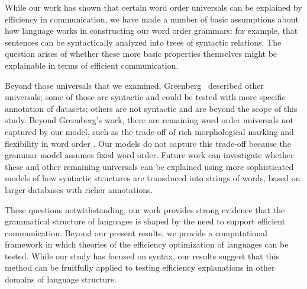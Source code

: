 \documentclass[9pt,twocolumn,twoside,lineno]{pnas-new}
\begin{document}
While our work has shown that certain word order universals can be explained by efficiency in communication, we have made a number of basic assumptions about how language works in constructing our word order grammars: for example, that sentences can be syntactically analyzed into trees of syntactic relations. The question arises of whether these more basic properties themselves might be explainable in terms of efficient communication.


Beyond those universals that we examined, Greenberg~\cite{greenberg1963universals} described other universals; some of those are syntactic and could be tested with more specific annotation of datasets; others are not syntactic and are beyond the scope of this study.
Beyond Greenberg's work, there are remaining word order universals not captured by our model, such as the trade-off of rich morphological marking and flexibility in word order \cite{jespersen1922,mcfadden2003morphological,futrell2015quantifying}.
Our models do not capture this trade-off because the grammar model assumes fixed word order.
Future work can investigate whether these and other remaining universals can be explained using more sophisticated models of how syntactic structures are transduced into strings of words, based on larger databases with richer annotations.


These questions notwithstanding, our work provides strong evidence that the grammatical structure of languages is shaped by the need to support efficient communication.
Beyond our present results, we provide a computational framework in which theories of the efficiency optimization of languages can be tested.
While our study has focused on syntax, our results suggest that this method can be fruitfully applied to testing efficiency explanations in other domains of language structure.
\end{document}
